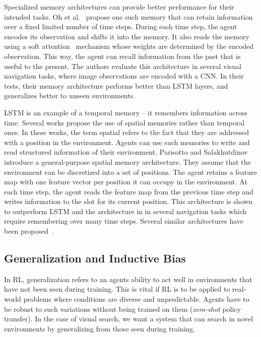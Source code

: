 Specialized memory architectures can provide better performance for their intended tasks.
Oh et al.~\cite{oh_control_2016} propose one such memory that can retain information over a fixed limited number of time steps.
During each time step, the agent encodes its observation and shifts it into the memory.
It also reads the memory using a soft attention~\cite{bahdanau_neural_2016} mechanism whose weights are determined by the encoded observation.
This way, the agent can recall information from the past that is useful to the present.
The authors evaluate this architecture in several visual navigation tasks, where image observations are encoded with a CNN.
In their tests, their memory architecture performs better than LSTM layers, and generalizes better to unseen environments.

LSTM is an example of a temporal memory -- it remembers information across time.
Several works propose the use of spatial memories rather than temporal ones.
In these works, the term spatial refers to the fact that they are addressed with a position in the environment.
Agents can use such memories to write and read structured information of their environment.
Parisotto and Salakhutdinov~\cite{parisotto_neural_2017} introduce a general-purpose spatial memory architecture.
They assume that the environment can be discretized into a set of positions.
The agent retains a feature map with one feature vector per position it can occupy in the environment.
At each time step, the agent reads the feature map from the previous time step and writes information to the slot for its current position.
This architecture is shown to outperform LSTM and the architecture in \cite{oh_control_2016} in several navigation tasks which require remembering over many time steps. Several similar architectures have been proposed~\cite{henriques_mapnet_2018,gupta_cognitive_2019,chaplot_object_2020}.

\subsection{Generalization and Inductive Bias}

In RL, generalization refers to an agents ability to act well in environments that have not been seen during training.
This is vital if RL is to be applied to real-world problems where conditions are diverse and unpredictable.
Agents have to be robust to such variations without being trained on them (\textit{zero-shot} policy transfer).
In the case of visual search, we want a system that can search in novel environments by generalizing from those seen during training.


